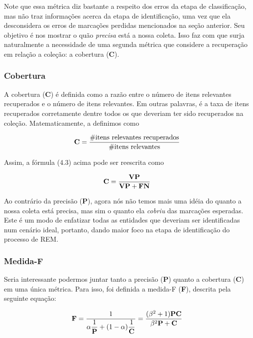 \documentclass[11pt]{report}
\begin{document}
Note que essa métrica diz bastante
a respeito dos erros da etapa de classificação, mas não traz informações acerca da etapa de identificação, uma vez que ela desconsidera os erros de
marcações perdidas mencionados na seção anterior. Seu objetivo é nos mostrar o quão \textit{precisa} está a nossa coleta. Isso faz com que surja naturalmente a necessidade de uma segunda métrica que considere a recuperação em relação a coleção: a cobertura (\textbf{C}).

\subsubsection{Cobertura}

\indent\indent A cobertura (\textbf{C}) é definida como a razão entre o número de itens relevantes recuperados e o número de itens relevantes.
Em outras palavras, é a taxa de itens recuperados corretamente dentre todos os que deveriam ter sido recuperados na coleção. Matematicamente, a definimos como

\begin{equation}
 \text{\textbf{C}} = \dfrac{\text{\#itens relevantes recuperados}}{\text{\#itens relevantes}}
\end{equation}

Assim, a fórmula (4.3) acima pode ser reescrita como

\begin{equation}
 \text{\textbf{C}} = \dfrac{\text{\textbf{VP}}}{\text{\textbf{VP}} + \text{\textbf{FN}}}
\end{equation}

Ao contrário da precisão (\textbf{P}), agora nós não temos mais uma idéia do quanto a nossa coleta está precisa, mas sim o quanto ela \textit{cobriu} das marcações esperadas. Este é um modo de enfatizar todas as entidades que deveriam ser identificadas num cenário ideal, portanto, dando maior foco na etapa de identificação do processo de REM.

\subsubsection{Medida-F}

\indent\indent Seria interessante podermos juntar tanto a precisão (\textbf{P}) quanto a cobertura (\textbf{C}) em uma única métrica. Para isso, foi definida a medida-F (\textbf{F}), descrita
pela seguinte equação:

\begin{equation}
 \text{\textbf{F}} = \dfrac{1}{\alpha\dfrac{1}{\text{\textbf{P}}} + (1 - \alpha)\dfrac{1}{\text{\textbf{C}}}} = \dfrac{(\beta^2 + 1)\text{\textbf{PC}}}{\beta^2\text{\textbf{P}} + \text{\textbf{C}}}
\end{equation}
\end{document}

